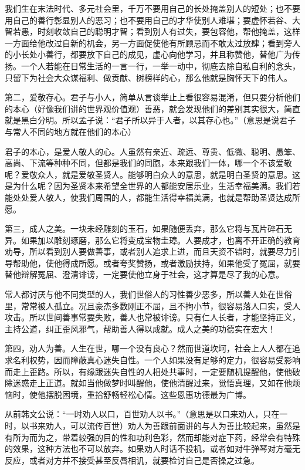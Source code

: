 \documentclass[12pt,UTF8]{ctexbook}
\begin{document}
我们生在末法时代、多元社会里，千万不要用自己的长处掩盖别人的短处；也不要用自己的善行彰显别人的恶习；也不要用自己的才华使别人难堪；要虚怀若谷、大智若愚，时刻收敛自己的聪明才智；看到别人有过失，要包容他，帮他掩盖，这样一方面给他改过自新的机会，另一方面促使他有所顾忌而不敢太过放肆；看到旁人的小长处小善行，都要放下自己的成见，虚心向他学习，并且称赞他，替他广为传扬。一个人若能在日常生活的一言一行，一举一动中，彻底去除自私自利的念头，只留下为社会大众谋福利、做贡献、树榜样的心，那么他就是胸怀天下的伟人。

第二，爱敬存心。君子与小人，简单从言谈举止上看很容易混淆，但只要分析他们的本心（好像我们讲的世界观价值观）善恶，就会发现他们的差别其实很大，简直就是黑白分明。所以孟子说：“君子所以异于人者，以其存心也。”（意思是说君子与常人不同的地方就在他们的本心）

君子的本心，是爱人敬人的心。人虽然有亲近、疏远、尊贵、低微、聪明、愚笨、高尚、下流等种种不同，但都是我们的同胞，本来跟我们一体，哪一个不该爱敬呢？爱敬众人，就是爱敬圣贤人。能够明白众人的意思，就是明白圣贤的意思。这是为什么呢？因为圣贤本来希望全世界的人都能安居乐业，生活幸福美满。我们若能处处爱人敬人，使我们周围的人，都能生活得幸福美满，也就是帮助圣贤达成所愿。

第三，成人之美。一块未经雕刻的玉石，如果随便丢弃，那么它将与瓦片碎石无异。如果加以雕刻琢磨，那么它将变成宝物圭璋。人要成才，也离不开正确的教育劝导，所以看到别人要做善事，或者别人追求上进，而且天资不错时，就要尽力引导帮助他，使他得成所愿。或者夸奖赞扬，或者激励扶持，如果他受了冤屈，就要替他辩解冤屈、澄清诽谤，一定要使他立身于社会，这才算是尽了我的心意。

常人都讨厌与他不同类型的人，我们世俗人的习性善少恶多，所以善人处在世俗里，常常被人孤立。况且豪杰多数刚正不屈，且不拘小节，很容易落人口实，受人攻击。所以世间善事常要失败，善人也常被诽谤。只有仁人长者，才能坚持正义，主持公道，纠正歪风邪气，帮助善人得以成就。成人之美的功德实在宏大！

第四，劝人为善。人生在世，哪一个没有良心？然而世道坎坷，社会上人人都在追求名利权势，因而障蔽真心迷失自性。一个人如果没有足够的定力，很容易受影响而走上歪路。所以，有缘跟迷失自性的人相处共事时，一定要随机提醒他，使他破除迷惑走上正道。就如当他做梦时叫醒他，使他清醒过来，觉悟真理，又如在他烦恼时，使他摆脱困境，重拾舒畅轻松心情。这些恩惠功德最为广博。

从前韩文公说：“一时劝人以口，百世劝人以书。”（意思是以口来劝人，只在一时，以书来劝人，可以流传百世）劝人为善跟前面讲的与人为善比较起来，虽然是有所为而为之，带着较强的目的性和功利色彩，然而却能对症下药，经常会有特殊的效果，这种方法也不可以放弃。如果劝人时话不投机，或者如对牛弹琴对方毫无反应，或者对方并不接受甚至反唇相讥，就要检讨自己是否操之过急。
\end{document}
